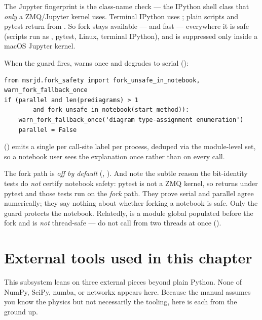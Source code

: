 The Jupyter fingerprint is the class-name check  --- the
IPython shell class that \emph{only} a ZMQ/Jupyter kernel uses. Terminal IPython
uses ; plain scripts and pytest return 
from . So fork stays available --- and fast --- everywhere it
is safe (scripts run as , pytest, Linux, terminal
IPython), and is suppressed only inside a macOS Jupyter kernel.

When the guard fires,  warns once and degrades to serial
():

\begin{lstlisting}
from msrjd.fork_safety import fork_unsafe_in_notebook, warn_fork_fallback_once
if (parallel and len(prediagrams) > 1
        and fork_unsafe_in_notebook(start_method)):
    warn_fork_fallback_once('diagram type-assignment enumeration')
    parallel = False
\end{lstlisting}

 () emits a
single  per call-site label per process, deduped via the
module-level  set, so a notebook user sees the explanation once
rather than on every call.

\begin{gotcha}
The fork path is \emph{off by default} (,
). And note the subtle reason the bit-identity
tests do \emph{not} certify notebook safety: pytest is not a ZMQ kernel, so
 returns  under pytest and those
tests run on the \emph{fork} path. They prove serial and parallel agree
numerically; they say nothing about whether forking a notebook is safe. Only the
guard protects the notebook. Relatedly,  is a module
global populated before the fork and is \emph{not} thread-safe --- do not call
 from two threads at once
().
\end{gotcha}

\section{External tools used in this chapter}\label{sec:ta-tools}

This subsystem leans on three external pieces beyond plain Python. None of NumPy,
SciPy, numba, or networkx appears here. Because the manual assumes you know the
physics but not necessarily the tooling, here is each from the ground up.

